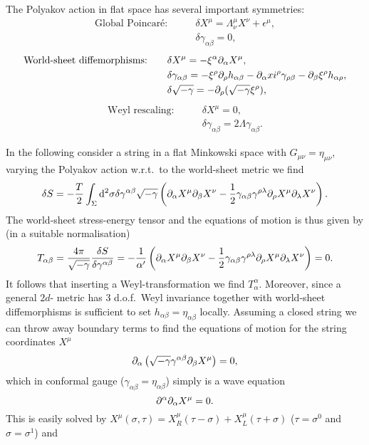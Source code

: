 The Polyakov action in flat space has several important symmetries: 
\begin{align}
    \text{Global Poincaré:}\qquad &\delta X^\mu = \Lambda^\mu_\nu X^\nu+\epsilon^\mu,\\
    &\delta \gamma_{\alpha\beta} = 0,
\end{align}
\begin{align}
    \text{World-sheet diffemorphisms:}\qquad &\delta X^\mu = -\xi^\alpha\partial_\alpha X^\mu,\\
    &\delta \gamma_{\alpha\beta} = -\xi^\rho\partial_\rho h_{\alpha\beta}-\partial_\alpha xi^\rho \gamma_{\rho\beta}-\partial_\beta \xi^\rho h_{\alpha\rho},\\
    &\delta\sqrt{-\gamma} = -\partial_\rho(\sqrt{-\gamma}\xi^\rho),
\end{align}
\begin{align}
    \text{Weyl rescaling:}\qquad &\delta X^\mu = 0,\\
    & \delta \gamma_{\alpha\beta} = 2\Lambda \gamma_{\alpha\beta}.
\end{align}

In the following consider a string in a flat Minkowski space with $G_{\mu\nu}=\eta_{\mu\nu}$, varying the Polyakov action w.r.t.\ to the world-sheet metric we find 
\begin{equation}
    \delta S = -\frac{T}{2}\int_\Sigma \mathrm{d}^2\sigma \delta\gamma^{\alpha\beta}\sqrt{-\gamma}\left(\partial_\alpha X^\mu\partial_\beta X^\nu-\frac{1}{2}\gamma_{\alpha\beta}\gamma^{\rho\lambda}\partial_\rho X^\mu\partial_\lambda X^\nu\right).
\end{equation}
The world-sheet stress-energy tensor and the equations of motion is thus given by (in a suitable normalisation)
\begin{equation}
    T_{\alpha\beta}= \frac{4\pi}{\sqrt{-\gamma}}\frac{\delta S}{\delta\gamma^{\alpha\beta}} = -\frac{1}{\alpha'}\left(\partial_\alpha X^\mu\partial_\beta X^\nu-\frac{1}{2}\gamma_{\alpha\beta}\gamma^{\rho\lambda}\partial_\rho X^\mu\partial_\lambda X^\nu\right) = 0.
\end{equation}
It follows that inserting a Weyl-transformation we find $T^{\alpha}_\alpha$. Moreover, since a general $2d$- metric has $3$ d.o.f.\ Weyl invariance together with world-sheet diffemorphisms is sufficient to set $h_{\alpha\beta}=\eta_{\alpha\beta}$ locally. Assuming a closed string we can throw away boundary terms to find the equations of motion for the string coordinates $X^\mu$
\begin{equation}
    \partial_\alpha\left(\sqrt{-\gamma}\gamma^{\alpha\beta}\partial_\beta X^\mu\right) = 0,
\end{equation}
which in conformal gauge ($\gamma_{\alpha\beta}=\eta_{\alpha\beta}$) simply is a wave equation 
\begin{equation}
    \partial^\alpha\partial_\alpha X^\mu = 0.
\end{equation}
This is easily solved by $X^\mu(\sigma,\tau)=X^\mu_R(\tau-\sigma)+X^\mu_L(\tau+\sigma)$ ($\tau =\sigma^0$ and $\sigma=\sigma^1$) and 


